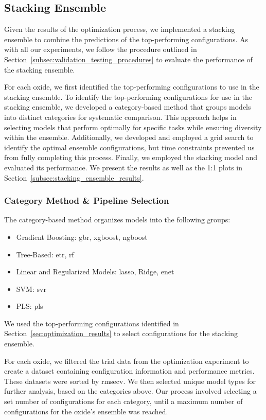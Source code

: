 \subsection{Stacking Ensemble}\label{subsec:stacking_ensemble}
Given the results of the optimization process, we implemented a stacking ensemble to combine the predictions of the top-performing configurations.
As with all our experiments, we follow the procedure outlined in Section~\ref{subsec:validation_testing_procedures} to evaluate the performance of the stacking ensemble.

For each oxide, we first identified the top-performing configurations to use in the stacking ensemble.
To identify the top-performing configurations for use in the stacking ensemble, we developed a category-based method that groups models into distinct categories for systematic comparison.
This approach helps in selecting models that perform optimally for specific tasks while ensuring diversity within the ensemble.
Additionally, we developed and employed a grid search to identify the optimal ensemble configurations, but time constraints prevented us from fully completing this process.
Finally, we employed the stacking model and evaluated its performance.
We present the results as well as the 1:1 plots in Section~\ref{subsec:stacking_ensemble_results}.

\subsubsection{Category Method \& Pipeline Selection}\label{subsec:category_method}
The category-based method organizes models into the following groups:

\begin{itemize}
    \item Gradient Boosting: \gls{gbr}, \gls{xgboost}, \gls{ngboost}
    \item Tree-Based: \gls{etr}, \gls{rf}
    \item Linear and Regularized Models: \gls{lasso}, Ridge, \gls{enet}
    \item SVM: \gls{svr}
    \item PLS: \gls{pls}
\end{itemize}

We used the top-performing configurations identified in Section~\ref{sec:optimization_results} to select configurations for the stacking ensemble.

For each oxide, we filtered the trial data from the optimization experiment to create a dataset containing configuration information and performance metrics.
These datasets were sorted by \gls{rmsecv}.
We then selected unique model types for further analysis, based on the categories above.
Our process involved selecting a set number of configurations for each category, until a maximum number of configurations for the oxide's ensemble was reached.

